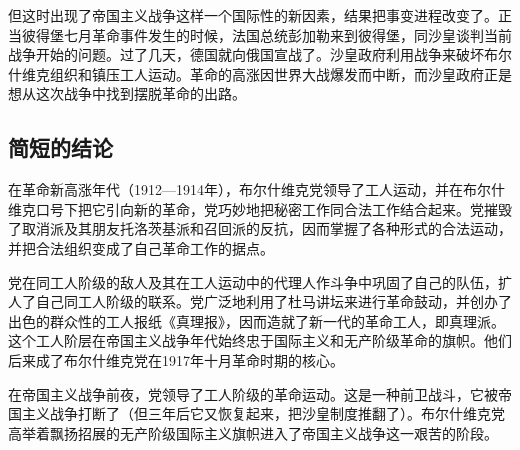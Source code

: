 但这时出现了帝国主义战争这样一个国际性的新因素，结果把事变进程改变了。正当彼得堡七月革命事件发生的时候，法国总统彭加勒来到彼得堡，同沙皇谈判当前战争开始的问题。过了几天，德国就向俄国宣战了。沙皇政府利用战争来破坏布尔什维克组织和镇压工人运动。革命的高涨因世界大战爆发而中断，而沙皇政府正是想从这次战争中找到摆脱革命的出路。


\subsection{简短的结论}

在革命新高涨年代（1912—1914年），布尔什维克党领导了工人运动，并在布尔什维克口号下把它引向新的革命，党巧妙地把秘密工作同合法工作结合起来。党摧毁了取消派及其朋友托洛茨基派和召回派的反抗，因而掌握了各种形式的合法运动，并把合法组织变成了自己革命工作的据点。

党在同工人阶级的敌人及其在工人运动中的代理人作斗争中巩固了自己的队伍，扩人了自己同工人阶级的联系。党广泛地利用了杜马讲坛来进行革命鼓动，并创办了出色的群众性的工人报纸《真理报》，因而造就了新一代的革命工人，即真理派。这个工人阶层在帝国主义战争年代始终忠于国际主义和无产阶级革命的旗帜。他们后来成了布尔什维克党在1917年十月革命时期的核心。

在帝国主义战争前夜，党领导了工人阶级的革命运动。这是一种前卫战斗，它被帝国主义战争打断了（但三年后它又恢复起来，把沙皇制度推翻了）。布尔什维克党高举着飘扬招展的无产阶级国际主义旗帜进入了帝国主义战争这一艰苦的阶段。

